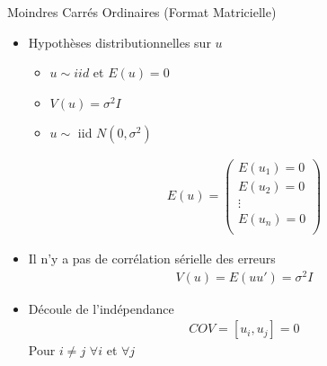 \documentclass{beamer}
\begin{document}
\begin{frame}{Moindres Carrés Ordinaires (Format Matricielle)}
\begin{itemize}
\item Hypothèses distributionnelles sur $u$
\begin{itemize}
\item $u \sim iid$ et $E(u)=0$
\item $V(u)=\sigma^2 I$
\item $u \sim$ iid $N(0,\sigma^2)$
\end{itemize}
\begin{align*}
E(u)=\begin{pmatrix}
E(u_1)=0\\ 
E(u_2)=0\\ 
\vdots\\
E(u_n)=0\\
\end{pmatrix}
\end{align*}
\item Il n'y a pas de corrélation sérielle des erreurs 
\begin{align*}
V(u)=E(uu')=\sigma^2 I 
\end{align*}
\item Découle de l'indépendance
\begin{align*}
COV=[u_i, u_j]=0
\end{align*}
Pour $i \ne j$ $\forall i$ et $\forall j$
\end{itemize}

\end{frame}
\end{document}
